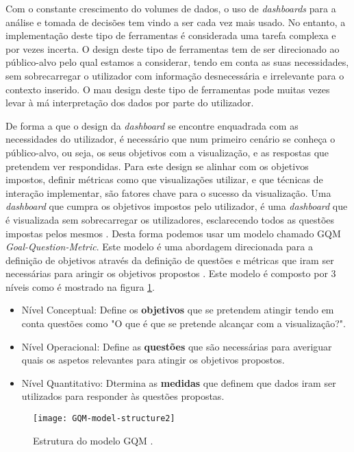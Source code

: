 Com o constante crescimento do volumes de dados, o uso de \textit{dashboards} para a análise e tomada de decisões tem vindo a ser cada vez mais usado. No entanto, a implementação deste tipo de ferramentas é considerada uma tarefa complexa e por vezes incerta. O design deste tipo de ferramentas tem de ser direcionado ao público-alvo pelo qual estamos a considerar, tendo em conta as suas necessidades, sem sobrecarregar o utilizador com informação desnecessária e irrelevante para o contexto inserido. O mau design deste tipo de ferramentas pode muitas vezes levar à má interpretação dos dados por parte do utilizador.

De forma a que o design da \textit{dashboard} se encontre enquadrada com as necessidades do utilizador, é necessário que num primeiro cenário se conheça o público-alvo, ou seja, os seus objetivos com a visualização, e as respostas que pretendem ver respondidas. Para este design se alinhar com os objetivos impostos, definir métricas como que visualizações utilizar, e que técnicas de interação implementar, são fatores chave para o sucesso da visualização. Uma \textit{dashboard} que cumpra os objetivos impostos pelo utilizador, é uma \textit{dashboard} que é visualizada sem sobrecarregar os utilizadores, esclarecendo todos as questões impostas pelos mesmos \cite{pappas2011riding}. Desta forma podemos usar um modelo chamado \gls{GQM} \textit{Goal-Question-Metric}. Este modelo é uma abordagem direcionada para a definição de objetivos através da definição de questões e métricas que iram ser necessárias para aringir os objetivos propostos \cite{janes2013effective}. Este modelo é composto por 3 níveis como é mostrado na figura \ref{fig:gqm-model}.

\begin{itemize}
  \item Nível Conceptual: Define os \textbf{objetivos} que se pretendem atingir tendo em conta questões como "O que é que se pretende alcançar com a visualização?".
  \item Nível Operacional: Define as \textbf{questões} que são necessárias para averiguar quais os aspetos relevantes para atingir os objetivos propostos. 
  \item Nível Quantitativo: Dtermina as \textbf{medidas} que definem que dados iram ser utilizados para responder às questões propostas.
\end{itemize}

\begin{figure}[htbp]
  \centering
  \texttt{[image: GQM-model-structure2]}
  \caption{Estrutura do modelo \gls{GQM} \cite{article}.}
  \label{fig:gqm-model}
\end{figure}

